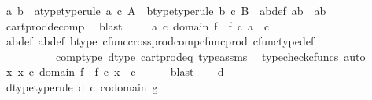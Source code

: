 \begin{isabellebody}
\ a\ b\ \ a{\isacharunderscore}{\kern0pt}type{\isacharbrackleft}{\kern0pt}type{\isacharunderscore}{\kern0pt}rule{\isacharbrackright}{\kern0pt}{\isacharcolon}{\kern0pt}\ {\isachardoublequoteopen}a\ {\isasymin}\isactrlsub c\ A{\isachardoublequoteclose}\ \ b{\isacharunderscore}{\kern0pt}type{\isacharbrackleft}{\kern0pt}type{\isacharunderscore}{\kern0pt}rule{\isacharbrackright}{\kern0pt}{\isacharcolon}{\kern0pt}\ {\isachardoublequoteopen}b\ {\isasymin}\isactrlsub c\ B{\isachardoublequoteclose}\ \ ab{\isacharunderscore}{\kern0pt}def{}{\isacharcolon}{\kern0pt}\ {\isachardoublequoteopen}ab\ {\isacharequal}{\kern0pt}\ {\isasymlangle}a{\isacharcomma}{\kern0pt}b{\isasymrangle}{\isachardoublequoteclose}\isanewline
\ \ \ \ \isamarkupfalse%
\ cart{\isacharunderscore}{\kern0pt}prod{\isacharunderscore}{\kern0pt}decomp\ \isamarkupfalse%
\ blast\isanewline
\ \ \isamarkupfalse%
\ \ {\isachardoublequoteopen}a\ {\isasymin}\isactrlsub c\ domain\ f\ {\isasymand}\ f\ {\isasymcirc}\isactrlsub c\ a\ {\isacharequal}{\kern0pt}\ c{\isachardoublequoteclose}\isanewline
\ \ \ \ \isamarkupfalse%
\ ab{\isacharunderscore}{\kern0pt}def\ ab{\isacharunderscore}{\kern0pt}def{}\ b{\isacharunderscore}{\kern0pt}type\ cfunc{\isacharunderscore}{\kern0pt}cross{\isacharunderscore}{\kern0pt}prod{\isacharunderscore}{\kern0pt}comp{\isacharunderscore}{\kern0pt}cfunc{\isacharunderscore}{\kern0pt}prod\ cfunc{\isacharunderscore}{\kern0pt}type{\isacharunderscore}{\kern0pt}def\isanewline
\ \ \ \ \ \ \ \ \ \ comp{\isacharunderscore}{\kern0pt}type\ d{\isacharunderscore}{\kern0pt}type\ cart{\isacharunderscore}{\kern0pt}prod{\isacharunderscore}{\kern0pt}eq{}\ type{\isacharunderscore}{\kern0pt}assms\ \isamarkupfalse%
\ {\isacharparenleft}{\kern0pt}typecheck{\isacharunderscore}{\kern0pt}cfuncs{\isacharcomma}{\kern0pt}\ auto{\isacharparenright}{\kern0pt}\isanewline
\ \ \isamarkupfalse%
\ \isamarkupfalse%
\ {\isachardoublequoteopen}{\isasymexists}x{\isachardot}{\kern0pt}\ x\ {\isasymin}\isactrlsub c\ domain\ f\ {\isasymand}\ f\ {\isasymcirc}\isactrlsub c\ x\ {\isacharequal}{\kern0pt}\ c{\isachardoublequoteclose}\isanewline
\ \ \ \ \isamarkupfalse%
\ blast\isanewline
{}\isamarkupfalse%
\isanewline
\ \ \isamarkupfalse%
\ d\ \isanewline
\ \ \isamarkupfalse%
\ d{\isacharunderscore}{\kern0pt}type{\isacharbrackleft}{\kern0pt}type{\isacharunderscore}{\kern0pt}rule{\isacharbrackright}{\kern0pt}{\isacharcolon}{\kern0pt}\ {\isachardoublequoteopen}d\ {\isasymin}\isactrlsub c\ codomain\ g{\isachardoublequoteclose}\isanewline

\end{isabellebody}
